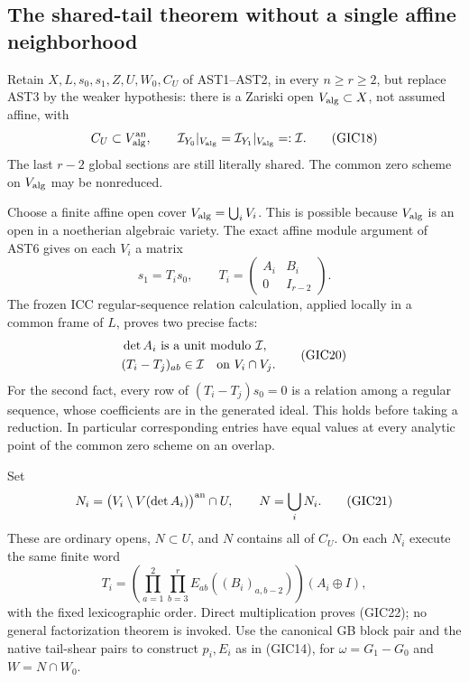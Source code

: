 \subsection{The shared-tail theorem without a single affine neighborhood}

Retain $X,L,s_0,s_1,Z,U,W_0,C_U$ of AST1--AST2, in every
$n\ge r\ge2$, but replace AST3 by the weaker hypothesis:
there is a Zariski open $V_{\rm alg}\subset X$, not assumed
affine, with
\[
 C_U\subset V_{\rm alg}^{\rm an},\qquad
 \mathcal I_{Y_0}|_{V_{\rm alg}}
        =\mathcal I_{Y_1}|_{V_{\rm alg}}=:\mathcal I.
 \tag{GIC18}
\]
The last $r-2$ global sections are still literally shared.
The common zero scheme on $V_{\rm alg}$ may be nonreduced.

Choose a finite affine open cover $V_{\rm alg}=\bigcup_iV_i$.
This is possible because $V_{\rm alg}$ is an open in a
noetherian algebraic variety.  The exact affine module argument
of AST6 gives on each $V_i$ a matrix
\[
    s_1=T_i s_0,\qquad
    T_i=\begin{pmatrix}A_i&B_i\\0&I_{r-2}\end{pmatrix}.
 \tag{GIC19}
\]
The frozen ICC regular-sequence relation calculation, applied
locally in a common frame of $L$, proves two precise facts:
\[
 \begin{split}
 &\det A_i\text{ is a unit modulo }\mathcal I,\\
 &(T_i-T_j)_{ab}\in\mathcal I
                          \quad\hbox{on }V_i\cap V_j.
 \end{split}
 \tag{GIC20}
\]
For the second fact, every row of $(T_i-T_j)s_0=0$ is a
relation among a regular sequence, whose coefficients are in
the generated ideal.  This holds before taking a reduction.
In particular corresponding entries have equal values at every
analytic point of the common zero scheme on an overlap.

Set
\[
 N_i=\bigl(V_i\setminus V(\det A_i)\bigr)^{\rm an}\cap U,
                            \qquad N=\bigcup_iN_i.
 \tag{GIC21}
\]
These are ordinary opens, $N\subset U$, and $N$ contains
all of $C_U$.  On each $N_i$ execute the same finite word
\[
 T_i=\left(\prod_{a=1}^2\prod_{b=3}^r
                   E_{ab}((B_i)_{a,b-2})\right)(A_i\oplus I),
 \tag{GIC22}
\]
with the fixed lexicographic order.  Direct multiplication
proves (GIC22); no general factorization theorem is invoked.
Use the canonical GB block pair and the native tail-shear
pairs to construct $p_i,E_i$ as in (GIC14), for
$\omega=G_1-G_0$ and $W=N\cap W_0$.

